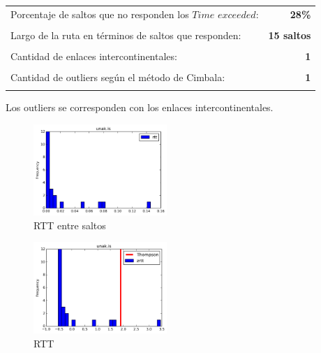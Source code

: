 \begin{center}
\begin{tabular}{p{6.5cm}r}
Porcentaje de saltos que no responden los $Time$ $exceeded$: & \textbf{28\%} \\ \\ 
Largo de la ruta en términos de saltos que responden: &\textbf{15 saltos} \\ \\
Cantidad de enlaces intercontinentales: & \textbf{1} \\ \\
Cantidad de outliers según el método de Cimbala: & \textbf{1} \\ \\
\end{tabular}
\end{center}

Los outliers se corresponden con los enlaces intercontinentales.


\begin{figure}[H]
  \centering
    \includegraphics[width=0.45\textwidth]{histogramas_rtt/unak-is.png}
  \caption{RTT entre saltos}
  \label{entropia-s}
\end{figure}

\begin{center}
\end{center}

\begin{figure}[H]
  \centering
    \includegraphics[width=0.45\textwidth]{histogramas_thompson/unak-is.png}
  \caption{RTT }
  \label{entropia-s}
\end{figure}

